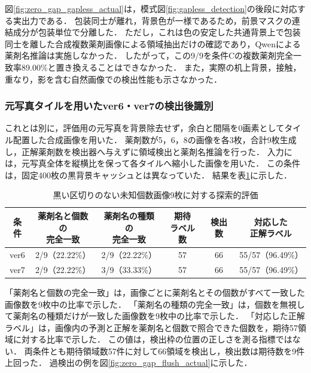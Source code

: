 \documentclass[uplatex,dvipdfmx]{jsarticle}
\begin{document}
図\ref{fig:zero_gap_gapless_actual}は，模式図\ref{fig:gapless_detection}の後段に対応する実出力である．
包装同士が離れ，背景色が一様であるため，前景マスクの連結成分が包装単位で分離した．
ただし，これは色の安定した共通背景上で包装同士を離した合成複数薬剤画像による領域抽出だけの確認であり，Qwenによる薬剤名推論は実施しなかった．
したがって，この9/9を条件Cの複数薬剤完全一致率89.00\%と置き換えることはできなかった．
また，実際の机上背景，接触，重なり，影を含む自然画像での検出性能も示さなかった．

\subsubsection{元写真タイルを用いたver6・ver7の検出後識別}\label{sec:zero_gap_identification}

これとは別に，評価用の元写真を背景除去せず，余白と間隔を0画素としてタイル配置した合成画像を用いた．
薬剤数が5，6，8の画像を各3枚，合計9枚生成し，正解薬剤数を検出器へ与えずに領域検出と薬剤名推論を行った．
入力には，元写真全体を縦横比を保って各タイルへ縮小した画像を用いた．
この条件は，固定400枚の黒背景キャッシュとは異なっていた．
結果を表\ref{tab:zero_gap_end_to_end}に示した．

\begin{table}[H]
  \centering
  \caption{黒い区切りのない未知個数画像9枚に対する探索的評価}
  \label{tab:zero_gap_end_to_end}
  \small
  \setlength{\tabcolsep}{4pt}
  \begin{tabular}{|c|c|c|c|c|c|}
    \hline
    条件 & \shortstack{薬剤名と個数の\\完全一致} & \shortstack{薬剤名の種類の\\完全一致} & \shortstack{期待\\ラベル数} & 検出数 & \shortstack{対応した\\正解ラベル} \\ \hline
    ver6 & 2/9（22.22\%） & 2/9（22.22\%） & 57 & 66 & 55/57（96.49\%） \\ \hline
    ver7 & 2/9（22.22\%） & 3/9（33.33\%） & 57 & 66 & 55/57（96.49\%） \\ \hline
  \end{tabular}
\end{table}

「薬剤名と個数の完全一致」は，画像ごとに薬剤名とその個数がすべて一致した画像数を9枚中の比率で示した．
「薬剤名の種類の完全一致」は，個数を無視して薬剤名の種類だけが一致した画像数を9枚中の比率で示した．
「対応した正解ラベル」は，画像内の予測と正解を薬剤名と個数で照合できた個数を，期待57領域に対する比率で示した．
この値は，検出枠の位置の正しさを測る指標ではない．
両条件とも期待領域数57件に対して66領域を検出し，検出数は期待数を9件上回った．
過検出の例を図\ref{fig:zero_gap_flush_actual}に示した．
\end{document}
